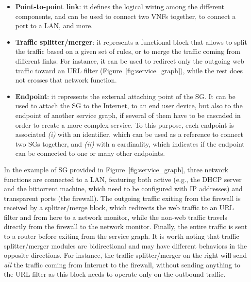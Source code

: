 \begin{itemize}
	\item \textbf{Point-to-point link}: it defines the logical wiring among the different components, and can be used to connect two VNFs together, 
	to connect a port to a LAN, and more. %
	\item \textbf{Traffic splitter/merger}: it represents a functional block that allows to split the traffic based on a given set of rules, or to merge the traffic coming from different links. For instance, it can be used to redirect only the outgoing web traffic toward an URL filter (Figure~\ref{fig:service_graph}), while the rest does not crosses that network function.

	\item \textbf{Endpoint}: it represents the external attaching point of the SG. It can be used to attach the SG to the Internet, to an end user device, but also to the endpoint of another service graph, if several of them have to be cascaded in order to create a more complex service.
	To this purpose, each endpoint is associated \textit{(i)} with an identifier, which can be used as a reference to connect two SGs together, and \textit{(ii)} with a cardinality, which indicates if the endpoint can be connected to one or many other endpoints.
\end{itemize}

In the example of SG provided in Figure~\ref{fig:service_graph}, three network functions are connected to a LAN, featuring both active (e.g., the DHCP server and the bittorrent machine, which need to be configured with IP addresses) and transparent ports (the firewall).
The outgoing traffic exiting from the firewall is received by a splitter/merge block, which redirects the web traffic to an URL filter and from here to a network monitor, while the non-web traffic travels directly from the firewall to the network monitor.
Finally, the entire traffic is sent to a router %
before exiting from the service graph.
It is worth noting that traffic splitter/merger modules are bidirectional and may have different behaviors in the opposite directions.
For instance, the traffic splitter/merger on the right will send \textit{all} the traffic coming from Internet to the firewall, without sending anything to the URL filter as this block needs to operate only on the outbound traffic.






